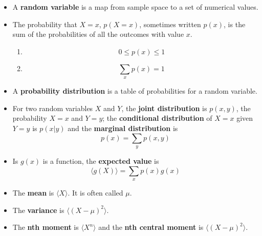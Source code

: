 \documentclass[11pt,a4paper]{scrartcl}
\begin{document}
\begin{itemize}
\item A \textbf{random variable} is a map from sample space to a set of numerical values.
\item The probability that $X=x$, $p(X=x)$, sometimes written $p(x)$,
  is the sum of the probabilities of all the outcomes with value $x$.
  \begin{enumerate}
    \item \begin{equation}
0\le p(x)\le 1
\end{equation}
\item 
\begin{equation}
\sum_x{p(x)}=1
\end{equation}
\end{enumerate}

\item A \textbf{probability distribution} is a table of probabilities for a random variable.

\item For two random variables $X$ and $Y$, the \textbf{joint distribution} is $p(x,y)$, the probability $X=x$ and $Y=y$; the \textbf{conditional distribution} of $X=x$ given $Y=y$ is $p(x|y)$ and the \textbf{marginal distribution} is
  \begin{equation}
    p(x)=\sum_{y}p(x,y)
  \end{equation}

\item Is $g(x)$ is a function, the \textbf{expected value} is
  \begin{equation}
\langle g(X)\rangle = \sum_x p(x)g(x)
  \end{equation}

\item The \textbf{mean} is $\langle X\rangle$. It is often called $\mu$.

\item The \textbf{variance} is $\langle (X-\mu)^2\rangle$.

\item The \textbf{nth moment} is $\langle X^n\rangle$ and the \textbf{nth central moment} is $\langle (X-\mu)^2\rangle$.
  
\end{itemize}
\end{document}
